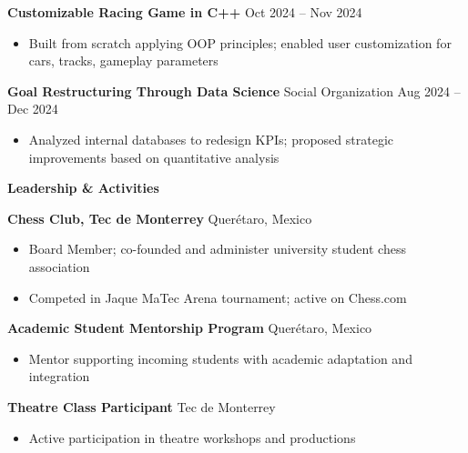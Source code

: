 \documentclass[11pt]{article}
\begin{document}
\textbf{Customizable Racing Game in C++} \hfill Oct 2024 – Nov 2024
\begin{itemize}[noitemsep, topsep=0pt, partopsep=0pt, parsep=0pt]
    \item Built from scratch applying OOP principles; enabled user customization for cars, tracks, gameplay parameters
\end{itemize}

\vspace{6pt}

\textbf{Goal Restructuring Through Data Science} \hfill Social Organization \hfill Aug 2024 – Dec 2024
\begin{itemize}[noitemsep, topsep=0pt, partopsep=0pt, parsep=0pt]
    \item Analyzed internal databases to redesign KPIs; proposed strategic improvements based on quantitative analysis
\end{itemize}

\vspace{12pt}

\begin{center}
    \textbf{Leadership \& Activities}
\end{center}

\textbf{Chess Club, Tec de Monterrey} \hfill Querétaro, Mexico
\begin{itemize}[noitemsep, topsep=0pt, partopsep=0pt, parsep=0pt]
    \item Board Member; co-founded and administer university student chess association
    \item Competed in Jaque MaTec Arena tournament; active on Chess.com
\end{itemize}

\vspace{6pt}

\textbf{Academic Student Mentorship Program} \hfill Querétaro, Mexico
\begin{itemize}[noitemsep, topsep=0pt, partopsep=0pt, parsep=0pt]
    \item Mentor supporting incoming students with academic adaptation and integration
\end{itemize}

\vspace{6pt}

\textbf{Theatre Class Participant} \hfill Tec de Monterrey
\begin{itemize}[noitemsep, topsep=0pt=0pt, partopsep=0pt, parsep=0pt]
    \item Active participation in theatre workshops and productions
\end{itemize}
\end{document}
